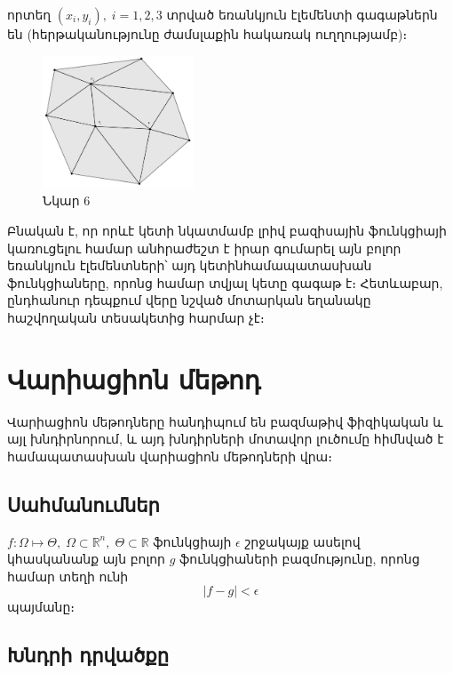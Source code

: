\documentclass[fleqn, bachelor,subf,12pt,notitlepage]{disser}
\begin{document}
\noindent որտեղ $(x_{i}, y_{i}), \; i=1, 2, 3$ տրված եռանկյուն էլեմենտի գագաթներն են (հերթականությունը ժամսլաքին հակառակ ուղղությամբ)։

\begin{figure}[h!]
\centering
\includegraphics[width=0.4\textwidth]{images/two_var_triangular}
\captionsetup{labelformat=empty}
\caption{\hfill Նկար 6}
\end{figure}

\noindent Բնական է, որ որևէ կետի նկատմամբ լրիվ բազիսային ֆունկցիայի կառուցելու համար անհրաժեշտ է իրար գումարել այն բոլոր եռանկյուն էլեմենտների՝ այդ կետին\newline համապատասխան ֆունկցիաները, որոնց համար տվյալ կետը գագաթ է։ Հետևաբար, ընդհանուր դեպքում վերը նշված մոտարկան եղանակը հաշվողական տեսակետից հարմար չէ։

\newpage
\section*{Վարիացիոն մեթոդ}

Վարիացիոն մեթոդները հանդիպում են բազմաթիվ ֆիզիկական և այլ խնդիրնորում, և այդ խնդիրների մոտավոր լուծումը հիմնված է համապատասխան վարիացիոն մեթոդների վրա։

\subsection*{Սահմանումներ}
$f : \Omega \mapsto \Theta, \; \Omega \subset \mathbb{R}^{n}, \; \Theta \subset \mathbb{R}$ ֆունկցիայի $\epsilon$ շրջակայք ասելով կհասկանանք այն բոլոր $g$ ֆունկցիաների բազմությունը, որոնց համար տեղի ունի
$$ \left|f-g\right| < \epsilon$$
պայմանը։



\subsection*{Խնդրի դրվածքը}
\end{document}
